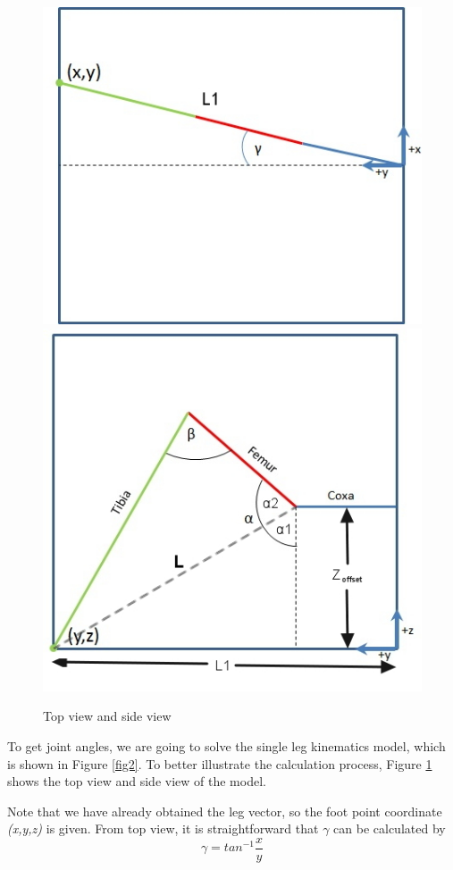 \documentclass[conference]{IEEEtran}
\begin{document}
\begin{figure}
    \centering
    \includegraphics[scale=0.36,align=t]{1-IK-top.jpg}
    \includegraphics[scale=0.35,align=t]{2-IK-side1.jpg}
    \caption{Top view and side view}
    \label{fig3}
\end{figure}

 To get joint angles, we are going to solve the single leg kinematics model, which is shown in Figure \ref{fig2}. To better illustrate the calculation process, Figure \ref{fig3} shows the top view and side view of the model.

Note that we have already obtained the leg vector, so the foot point coordinate \textit{(x,y,z)} is given. From top view, it is straightforward that \(\gamma\) can be calculated by 
\begin{equation}
    \gamma = tan^{-1} \frac{x}{y}
\end{equation}
\end{document}
